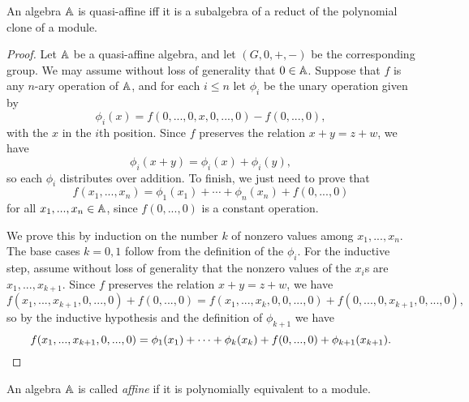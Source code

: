 \documentclass[letterpaper,11pt]{article}
\begin{document}
\begin{prop} An algebra $\mathbb{A}$ is quasi-affine iff it is a subalgebra of a reduct of the polynomial clone of a module.%
\end{prop}
\begin{proof} Let $\mathbb{A}$ be a quasi-affine algebra, and let $(G,0,+,-)$ be the corresponding group. We may assume without loss of generality that $0 \in \mathbb{A}$. Suppose that $f$ is any $n$-ary operation of $\mathbb{A}$, and for each $i \le n$ let $\phi_i$ be the unary operation given by
\[
\phi_i(x) = f(0,...,0,x,0,...,0) - f(0,...,0),
\]
with the $x$ in the $i$th position. Since $f$ preserves the relation $x+y = z+w$, we have
\[
\phi_i(x+y) = \phi_i(x) + \phi_i(y),
\]
so each $\phi_i$ distributes over addition. To finish, we just need to prove that
\[
f(x_1, ..., x_n) = \phi_1(x_1) + \cdots + \phi_n(x_n) + f(0,...,0)
\]
for all $x_1, ..., x_n \in \mathbb{A}$, since $f(0,...,0)$ is a constant operation.

We prove this by induction on the number $k$ of nonzero values among $x_1, ..., x_n$. The base cases $k = 0,1$ follow from the definition of the $\phi_i$. For the inductive step, assume without loss of generality that the nonzero values of the $x_i$s are $x_1, ..., x_{k+1}$. Since $f$ preserves the relation $x+y = z+w$, we have
\[
f(x_1, ..., x_{k+1}, 0, ..., 0) + f(0,...,0) = f(x_1, ..., x_k, 0, 0, ..., 0) + f(0, ..., 0, x_{k+1}, 0, ..., 0),
\]
so by the inductive hypothesis and the definition of $\phi_{k+1}$ we have
\[
f(x_1, ..., x_{k+1}, 0, ..., 0) = \phi_1(x_1) + \cdots + \phi_k(x_k) + f(0, ..., 0) + \phi_{k+1}(x_{k+1}).\qedhere%
\]
\end{proof}

\begin{defn} An algebra $\mathbb{A}$ is called \emph{affine} if it is polynomially equivalent to a module.
\end{defn}
\end{document}
